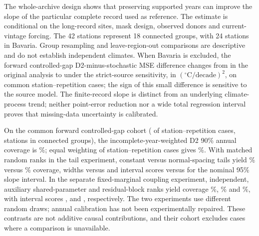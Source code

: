 \documentclass[draft,linenumbers]{agujournal2025}
\begin{document}
The whole-archive design shows that preserving supported years can improve the slope of the particular complete record used as reference. The estimate is conditional on the long-record sites, mask design, observed donors and current-vintage forcing. The 42 stations represent 18 connected groups, with 24 stations in Bavaria. Group resampling and leave-region-out comparisons are descriptive and do not establish independent climates. When Bavaria is excluded, the forward controlled-gap D2-minus-stochastic MSE difference changes from \SRBayernCrossOld{} in the original analysis to \SRBayernCrossNew{} under the strict-source sensitivity, in $({}^{\circ}\mathrm{C}/\mathrm{decade})^2$, on \SRBayernCrossN{} common station--repetition cases; the sign of this small difference is sensitive to the source model. The finite-record slope is distinct from an underlying climate-process trend; neither point-error reduction nor a wide total regression interval proves that missing-data uncertainty is calibrated.

On the common forward controlled-gap cohort (\UCCommon{} of \UCAll{} station--repetition cases, \UCStations{} stations in \UCGroups{} connected groups), the incomplete-year-weighted D2 90\% annual coverage is \UCAnnual\%; equal weighting of station--repetition cases gives \UCAnnualEqual\%. With matched random ranks in the tail experiment, constant versus normal-spacing tails yield \UCTailConstant\% versus \UCTailNormal\% coverage, widths \UCTailWidthConstant{} versus \UCTailWidthNormal{} and interval scores \UCTailScoreConstant{} versus \UCTailScoreNormal{} for the nominal 95\% slope interval. In the separate fixed-marginal coupling experiment, independent, auxiliary shared-parameter and residual-block ranks yield coverage \UCIndependent\%, \UCShared\% and \UCBlocks\%, with interval scores \UCIndependentScore{}, \UCSharedScore{} and \UCBlocksScore{}, respectively. The two experiments use different random draws; annual calibration has not been experimentally repaired. These contrasts are not additive causal contributions, and their cohort excludes cases where a comparison is unavailable.
\end{document}
